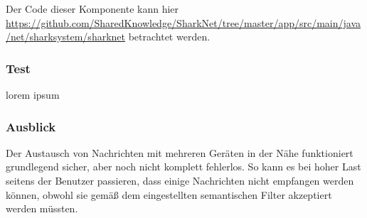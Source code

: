 Der Code dieser Komponente kann hier \url{https://github.com/SharedKnowledge/SharkNet/tree/master/app/src/main/java/net/sharksystem/sharknet} betrachtet werden. 

\subsubsection{Test}
lorem ipsum
\subsubsection{Ausblick}
Der Austausch von Nachrichten mit mehreren Geräten in der Nähe funktioniert grundlegend sicher, aber noch nicht komplett fehlerlos. So kann es bei hoher Last seitens der Benutzer passieren, dass einige Nachrichten nicht empfangen werden können, obwohl sie gemäß dem eingestellten semantischen Filter akzeptiert werden müssten. 
\newpage